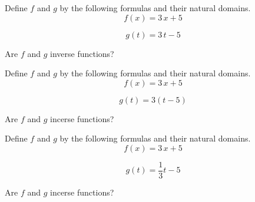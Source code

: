 \documentclass{ximera}
\author{Lee Wayand}
\begin{document}
\begin{exercise}



\begin{question}

Define $f$ and $g$ by the following formulas and their natural domains. \\


\[
f(x) = 3 \, x + 5
\]



\[
g(t) = 3 \, t - 5
\]


Are $f$ and $g$ inverse functions? \\


\begin{multipleChoice}
\end{multipleChoice}

\end{question}








\begin{question}

Define $f$ and $g$ by the following formulas and their natural domains. \\


\[
f(x) = 3 \, x + 5
\]



\[
g(t) = 3 (t - 5)
\]


Are $f$ and $g$ incerse functions? \\


\begin{multipleChoice}
\end{multipleChoice}

\end{question}










\begin{question}

Define $f$ and $g$ by the following formulas and their natural domains. \\


\[
f(x) = 3 \, x + 5
\]



\[
g(t) = \frac{1}{3} t - 5
\]


Are $f$ and $g$ incerse functions? \\



\end{question}
\end{exercise}
\end{document}
